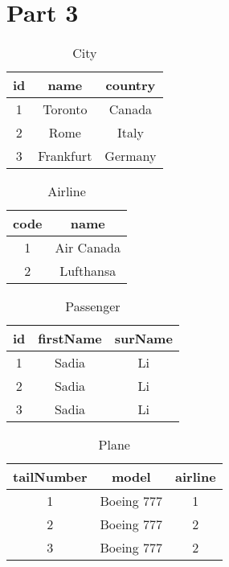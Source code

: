 \section{Part 3}
\begin{table}[h!]
\centering         
\begin{tabular}{|c|c|c|} 
\hline             
id & name & country \\ 
\hline
1 & Toronto & Canada \\ 
\hline
2 & Rome & Italy \\
\hline
3 & Frankfurt & Germany \\ 
\hline
\end{tabular}
\caption{City} 
\label{tab:example} 
\end{table}

\begin{table}[h!] 
\centering          
\begin{tabular}{|c|c|} 
\hline             
code & name \\ 
\hline
1 & Air Canada \\ 
\hline
2 & Lufthansa \\ 
\hline
\end{tabular}
\caption{Airline} 
\label{tab:example} 
\end{table}

\begin{table}[h!]
\centering         
\begin{tabular}{|c|c|c|} 
\hline             
id & firstName & surName \\ 
\hline
1 & Sadia & Li \\ 
\hline
2 & Sadia & Li \\ 
\hline
3 & Sadia & Li \\ 
\hline
\end{tabular}
\caption{Passenger} 
\label{tab:example} 
\end{table}

\begin{table}[h!]
\centering         
\begin{tabular}{|c|c|c|} 
\hline             
tailNumber & model & airline \\ 
\hline
1 & Boeing 777 & 1 \\ 
\hline
2 & Boeing 777 & 2 \\
\hline
3 & Boeing 777 & 2 \\ 
\hline
\end{tabular}
\caption{Plane} 
\label{tab:example} 
\end{table}

